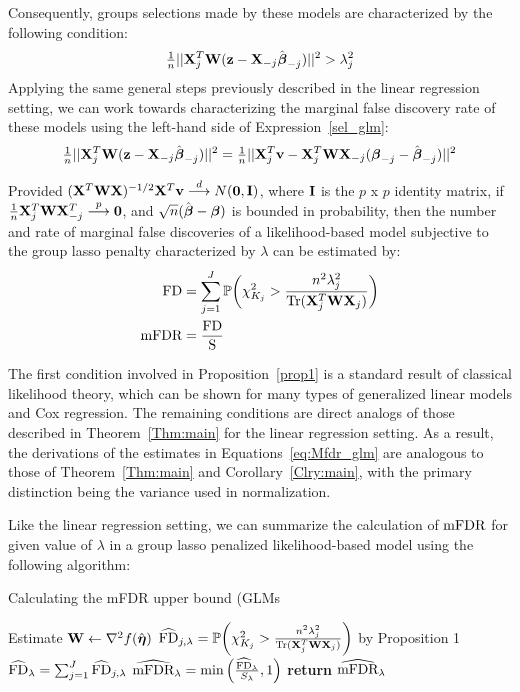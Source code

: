 Consequently, groups selections made by these models are characterized by the following condition:
\begin{equation}
\label{eq:sel_glm}
\tfrac{1}{n}||\mathbf{X}_j^T\mathbf{W}(\mathbf{z} - \mathbf{X}_{-j}\hat{\boldsymbol{\beta}}_{-j})||^2 > \lambda_j^2
\end{equation}
Applying the same general steps previously described in the linear regression setting, we can work towards characterizing the marginal false discovery rate of these models using the left-hand side of Expression~\ref{sel_glm}:
\begin{equation}
\label{eq:Mfdr_proof_glm}
\tfrac{1}{n}||\mathbf{X}_j^T\mathbf{W}(\mathbf{z} - \mathbf{X}_{-j}\hat{\boldsymbol{\beta}}_{-j})||^2 = \tfrac{1}{n}||\mathbf{X}_j^T\mathbf{v} - \mathbf{X}_j^T\mathbf{W}\mathbf{X}_{-j}(\boldsymbol{\beta}_{-j} - \hat{\boldsymbol{\beta}}_{-j})||^2 
\end{equation}

\begin{prop}
\label{prop1}
Provided $(\mathbf{X}^T\mathbf{W}\mathbf{X})^{-1/2}\mathbf{X}^T\mathbf{v} \overset{d}{\longrightarrow} N(\mathbf{0}, \mathbf{I})$, where $\mathbf{I}$ is the $p$ x $p$ identity matrix, if $\tfrac{1}{n}\mathbf{X}_j^T \mathbf{W} \mathbf{X}_{-j}^T \overset{p}{\longrightarrow} \mathbf{0}$, and $\sqrt{n}(\hat{\boldsymbol{\beta}}- \boldsymbol{\beta})$ is bounded in probability, then the number and rate of marginal false discoveries of a likelihood-based model subjective to the group lasso penalty characterized by $\lambda$ can be estimated by:
\begin{align}
\label{eq:Mfdr_glm}
\begin{alignedat}{2}
\textrm{FD} &= \sum_{j = 1}^{J} \mathbb{P} \bigg(\chi^2_{K_j} > \frac{n^2\lambda_j^2}{\operatorname{Tr}(\mathbf{X}_j^T\mathbf{W}\mathbf{X}_j)}\bigg)\\
\textrm{mFDR} &= \frac{\textrm{FD}}{\text{S}} 
\end{alignedat}
\end{align}
\end{prop}

The first condition involved in Proposition~\ref{prop1} is a standard result of classical likelihood theory, which can be shown for many types of generalized linear models and Cox regression. The remaining conditions are direct analogs of those described in Theorem~\ref{Thm:main} for the linear regression setting. As a result, the derivations of the estimates in Equations~\ref{eq:Mfdr_glm} are analogous to those of Theorem~\ref{Thm:main} and Corollary~\ref{Clry:main}, with the primary distinction being the variance used in normalization. 

Like the linear regression setting, we can summarize the calculation of $\textrm{mFDR}$ for given value of $\lambda$ in a group lasso penalized likelihood-based model using the following algorithm:

\begin{algorithm*}
\caption{Calculating the mFDR upper bound (GLMs}\label{Alg:mfdr_glm}
\begin{algorithmic}[10]
\Procedure{}{}
\State Estimate $\mathbf{W} \gets \nabla^2f(\hat{\boldsymbol{\eta}})$
\State $\widehat{\textrm{FD}}_{j, \lambda} = \mathbb{P} \bigg(\chi^2_{K_j} > \frac{n^2\lambda_j^2}{\operatorname{Tr}(\mathbf{X}_j^T\mathbf{W}\mathbf{X}_j)}\bigg)$ by Proposition 1
\EndFor
\State $\widehat{\textrm{FD}}_\lambda = \sum_{j=1}^{J} \widehat{\textrm{FD}}_{j, \lambda} $
\State $\widehat{\textrm{mFDR}}_\lambda = \text{min}\left(\frac{\widehat{\textrm{FD}}_\lambda}{S_\lambda}, 1 \right)$
\EndProcedure
\State \textbf{return} $\widehat{\textrm{mFDR}}_\lambda $
\end{algorithmic}
\end{algorithm*}

